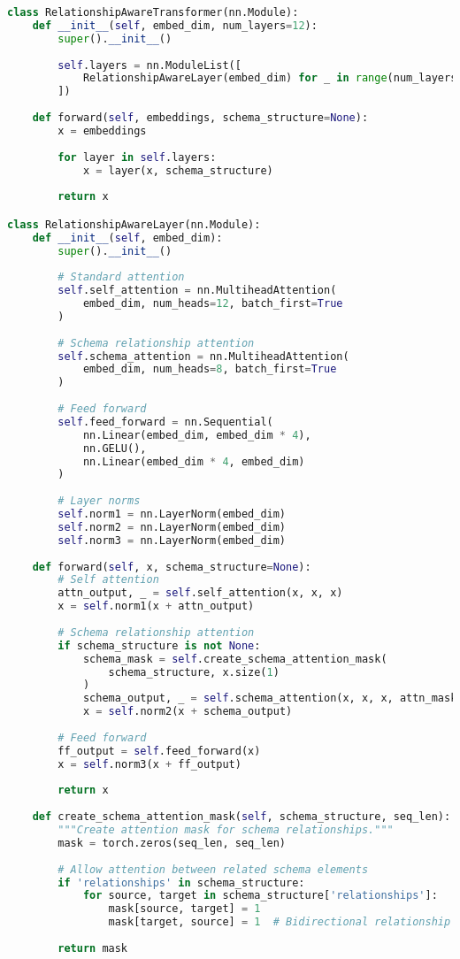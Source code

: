 \begin{lstlisting}[language=Python, caption=Schema-aware database tokenization system]
class RelationshipAwareTransformer(nn.Module):
    def __init__(self, embed_dim, num_layers=12):
        super().__init__()
        
        self.layers = nn.ModuleList([
            RelationshipAwareLayer(embed_dim) for _ in range(num_layers)
        ])
        
    def forward(self, embeddings, schema_structure=None):
        x = embeddings
        
        for layer in self.layers:
            x = layer(x, schema_structure)
        
        return x

class RelationshipAwareLayer(nn.Module):
    def __init__(self, embed_dim):
        super().__init__()
        
        # Standard attention
        self.self_attention = nn.MultiheadAttention(
            embed_dim, num_heads=12, batch_first=True
        )
        
        # Schema relationship attention
        self.schema_attention = nn.MultiheadAttention(
            embed_dim, num_heads=8, batch_first=True
        )
        
        # Feed forward
        self.feed_forward = nn.Sequential(
            nn.Linear(embed_dim, embed_dim * 4),
            nn.GELU(),
            nn.Linear(embed_dim * 4, embed_dim)
        )
        
        # Layer norms
        self.norm1 = nn.LayerNorm(embed_dim)
        self.norm2 = nn.LayerNorm(embed_dim)
        self.norm3 = nn.LayerNorm(embed_dim)
        
    def forward(self, x, schema_structure=None):
        # Self attention
        attn_output, _ = self.self_attention(x, x, x)
        x = self.norm1(x + attn_output)
        
        # Schema relationship attention
        if schema_structure is not None:
            schema_mask = self.create_schema_attention_mask(
                schema_structure, x.size(1)
            )
            schema_output, _ = self.schema_attention(x, x, x, attn_mask=schema_mask)
            x = self.norm2(x + schema_output)
        
        # Feed forward
        ff_output = self.feed_forward(x)
        x = self.norm3(x + ff_output)
        
        return x
    
    def create_schema_attention_mask(self, schema_structure, seq_len):
        """Create attention mask for schema relationships."""
        mask = torch.zeros(seq_len, seq_len)
        
        # Allow attention between related schema elements
        if 'relationships' in schema_structure:
            for source, target in schema_structure['relationships']:
                mask[source, target] = 1
                mask[target, source] = 1  # Bidirectional relationship
        
        return mask
\end{lstlisting}

